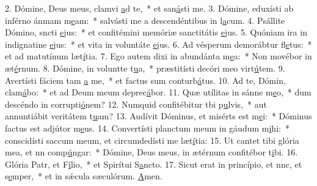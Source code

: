 2. Dómine, Deus meus, clamvi \uline{a}d te,~* et san\uline{á}sti me.
3. Dómine, eduxísti ab inférno ánmam m\uline{e}am:~* salvásti me a descendéntibus in l\uline{a}cum.
4. Psállite Dómino, sncti \uline{e}jus:~* et confitémini memóriæ sanctitátis \uline{e}jus.
5. Quóniam ira in indignatine \uline{e}jus:~* et vita in voluntáte \uline{e}jus.
6. Ad vésperum demorábtur fl\uline{e}tus:~* et ad matutínum læt\uline{í}tia.
7. Ego autem dixi in abundánta m\uline{e}a:~* Non movébor in æt\uline{é}rnum.
8. Dómine, in voluntte t\uline{u}a,~* præstitísti decóri meo virt\uline{ú}tem.
9. Avertísti fáciem tam \uline{a} me,~* et factus sum conturb\uline{á}tus.
10. Ad te, Dómin, clam\uline{á}bo:~* et ad Deum meum deprec\uline{á}bor.
11. Quæ utílitas in sánne m\uline{e}o,~* dum descéndo in corrupti\uline{ó}nem?
12. Numquid confitébitur tbi p\uline{u}lvis,~* aut annuntiábit veritátem t\uline{u}am?
13. Audívit Dóminus, et misérts est m\uline{e}i:~* Dóminus factus est adjútor m\uline{e}us.
14. Convertísti planctum meum in gáudum m\uline{i}hi:~* conscidísti saccum meum, et circumdedísti me læt\uline{í}tia:
15. Ut cantet tibi glória mea, et nn comp\uline{ú}ngar:~* Dómine, Deus meus, in ætérnum confitébor t\uline{i}bi.
16. Glória Patr, et F\uline{í}lio,~* et Spirítui S\uline{a}ncto.
17. Sicut erat in princípio, et nnc, et s\uline{e}mper,~* et in sǽcula sæculórum. \uline{A}men.

